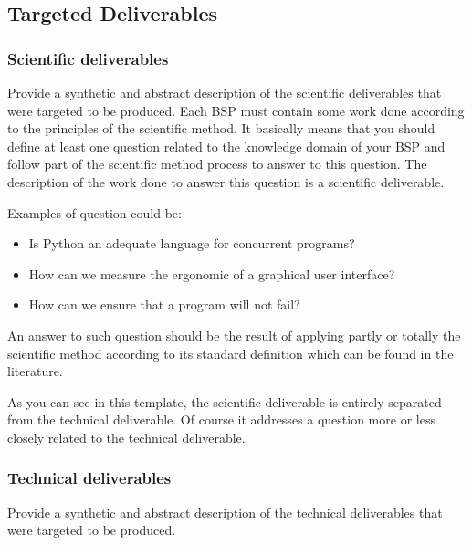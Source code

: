 {\color{gray}
\subsection{Targeted Deliverables}
\label{sec-deliverables}
\subsubsection{Scientific deliverables}
Provide a synthetic and abstract description of the scientific deliverables that were targeted to be produced. 
Each BSP must contain some work done according to the principles of the scientific method. It basically means that you should define at least one question related to the knowledge domain of your BSP and follow part of the scientific method process to answer to this question. The description of the work done to answer this question is a scientific deliverable.

Examples of question could be:
\begin{itemize}
	\item Is Python an adequate language for concurrent programs?
	\item How can we measure the ergonomic of a graphical user interface?
	\item How can we ensure that a program will not fail?
\end{itemize}

An answer to such question should be the result of applying partly or totally the scientific method according to its standard definition which can be found in the literature.

As you can see in this template, the scientific deliverable is entirely separated from the technical deliverable. Of course it addresses a question more or less closely related to the technical deliverable. 

\subsubsection{Technical deliverables}
Provide a synthetic and abstract description of the technical deliverables that were targeted to be produced. 
}

